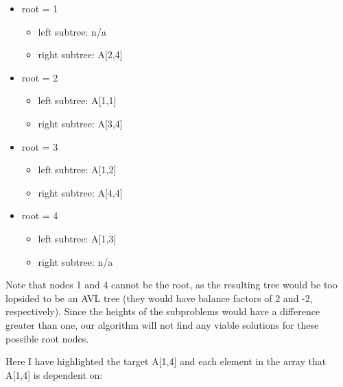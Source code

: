 \documentclass[a4paper]{article}
\begin{document}
\begin{itemize}
    \item root = 1
    \begin{itemize}
        \item left subtree: n/a
        \item right subtree: A[2,4]
    \end{itemize}
    \item root = 2
    \begin{itemize}
        \item left subtree: A[1,1]
        \item right subtree: A[3,4]
    \end{itemize}
    \item root = 3
    \begin{itemize}
        \item left subtree: A[1,2]
        \item right subtree: A[4,4]
    \end{itemize}
    \item root = 4
    \begin{itemize}
        \item left subtree: A[1,3]
        \item right subtree: n/a
    \end{itemize}
\end{itemize}

Note that nodes 1 and 4 cannot be the root, as the resulting tree would be too lopsided to be an AVL tree (they would have balance factors of 2 and -2, respectively). Since the heights of the subproblems would have a difference greater than one, our algorithm will not find any viable solutions for these possible root nodes.

Here I have highlighted the target A[1,4] and each element in the array that A[1,4] is dependent on:
\end{document}
